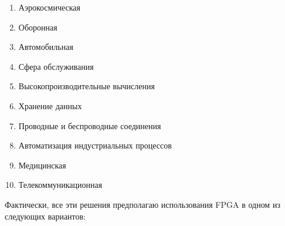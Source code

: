 \begin{enumerate}
	\item Аэрокосмическая
	\item Оборонная
	\item Автомобильная
	\item Сфера обслуживания
	\item Высокопроизводительные вычисления
	\item Хранение данных
	\item Проводные и беспроводные соединения
	\item Автоматизация индустриальных процессов
	\item Медицинская
	\item Телекоммуникационная
\end{enumerate}

Фактически, все эти решения предполагаю использования FPGA в одном из следующих
вариантов:


